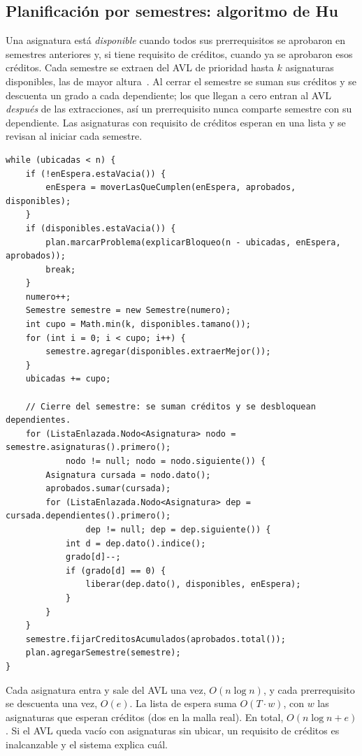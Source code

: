 \documentclass[11pt,letterpaper]{article}
\begin{document}
\subsection{Planificación por semestres: algoritmo de Hu}
Una asignatura está \emph{disponible} cuando todos sus prerrequisitos se aprobaron en semestres anteriores y, si tiene requisito de créditos, cuando ya se aprobaron esos créditos. Cada semestre se extraen del AVL de prioridad hasta $k$ asignaturas disponibles, las de mayor altura~\cite{hu1961}. Al cerrar el semestre se suman sus créditos y se descuenta un grado a cada dependiente; los que llegan a cero entran al AVL \emph{después} de las extracciones, así un prerrequisito nunca comparte semestre con su dependiente. Las asignaturas con requisito de créditos esperan en una lista y se revisan al iniciar cada semestre.
\begin{lstlisting}[style=java]
while (ubicadas < n) {
    if (!enEspera.estaVacia()) {
        enEspera = moverLasQueCumplen(enEspera, aprobados, disponibles);
    }
    if (disponibles.estaVacia()) {
        plan.marcarProblema(explicarBloqueo(n - ubicadas, enEspera, aprobados));
        break;
    }
    numero++;
    Semestre semestre = new Semestre(numero);
    int cupo = Math.min(k, disponibles.tamano());
    for (int i = 0; i < cupo; i++) {
        semestre.agregar(disponibles.extraerMejor());
    }
    ubicadas += cupo;

    // Cierre del semestre: se suman créditos y se desbloquean dependientes.
    for (ListaEnlazada.Nodo<Asignatura> nodo = semestre.asignaturas().primero();
            nodo != null; nodo = nodo.siguiente()) {
        Asignatura cursada = nodo.dato();
        aprobados.sumar(cursada);
        for (ListaEnlazada.Nodo<Asignatura> dep = cursada.dependientes().primero();
                dep != null; dep = dep.siguiente()) {
            int d = dep.dato().indice();
            grado[d]--;
            if (grado[d] == 0) {
                liberar(dep.dato(), disponibles, enEspera);
            }
        }
    }
    semestre.fijarCreditosAcumulados(aprobados.total());
    plan.agregarSemestre(semestre);
}
\end{lstlisting}

Cada asignatura entra y sale del AVL una vez, $O(n \log n)$, y cada prerrequisito se descuenta una vez, $O(e)$. La lista de espera suma $O(T \cdot w)$, con $w$ las asignaturas que esperan créditos (dos en la malla real). En total, $O(n \log n + e)$. Si el AVL queda vacío con asignaturas sin ubicar, un requisito de créditos es inalcanzable y el sistema explica cuál.
\end{document}
